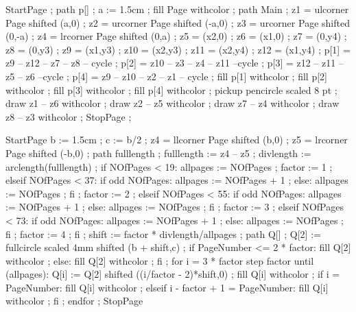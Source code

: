 StartPage ;
path p[] ;
a := 1.5cm ;
fill Page withcolor  ;
path Main ;
z1 = ulcorner Page shifted (a,0) ;
z2 = urcorner Page shifted (-a,0) ;
z3 = urcorner Page shifted (0,-a) ;
z4 = lrcorner Page shifted (0,a) ;
z5 = (x2,0) ;
z6 = (x1,0) ;
z7 = (0,y4) ;
z8 = (0,y3) ;
z9 = (x1,y3) ;
z10 = (x2,y3) ;
z11 = (x2,y4) ;
z12 = (x1,y4) ;
p[1] = z9 -- z12 -- z7 -- z8 -- cycle ;
p[2] = z10 -- z3 -- z4 -- z11 --cycle ;
p[3] = z12 -- z11 -- z5 -- z6 --cycle ;
p[4] = z9 -- z10 -- z2 -- z1 -- cycle ;
fill p[1] withcolor  ;
fill p[2] withcolor  ;
fill p[3] withcolor  ;
fill p[4] withcolor  ;
pickup pencircle scaled 8 pt ;
draw z1 -- z6 withcolor  ;
draw z2 -- z5 withcolor  ;
draw z7 -- z4 withcolor  ;
draw z8 -- z3 withcolor  ;
StopPage ;
\stopuniqueMPgraphic 

StartPage
b := 1.5cm ;
c := b/2 ;
z4 = llcorner Page shifted (b,0) ;
z5 = lrcorner Page shifted (-b,0) ;
path fulllength ;
fulllength := z4 -- z5 ;
divlength := arclength(fulllength) ;
if NOfPages < 19:
	allpages := NOfPages ;
	factor := 1 ;
elseif NOfPages < 37:
	if odd NOfPages:
		allpages := NOfPages + 1 ;
	else:
		allpages := NOfPages ;
	fi ;
	factor := 2 ;
elseif NOfPages < 55:
	if odd NOfPages:
		allpages := NOfPages + 1 ;
	else:
		allpages := NOfPages ;
	fi ;
	factor := 3 ;
elseif NOfPages < 73:
	if odd NOfPages:
		allpages := NOfPages + 1 ;
	else:
		allpages := NOfPages ;
	fi ;
	factor := 4 ;
fi ;
shift := factor * divlength/allpages ;
path Q[] ;
Q[2] := fullcircle scaled 4mm shifted (b + shift,c) ;
if PageNumber <= 2 * factor:
	fill Q[2] withcolor   ;
else:
	fill Q[2] withcolor   ;
fi ;
for i = 3 * factor step factor until (allpages):
	Q[i] := Q[2] shifted ((i/factor - 2)*shift,0) ;
	fill Q[i] withcolor  ;
	if i = PageNumber:
		fill Q[i] withcolor  ;
	elseif i - factor + 1 = PageNumber:
		fill Q[i] withcolor  ;
	fi ;
endfor ;
StopPage
\stopuseMPgraphic


